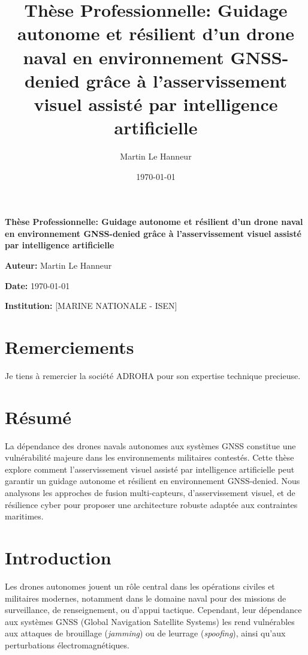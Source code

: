 \documentclass[12pt, a4paper, twoside, openright]{report}
\title{Thèse Professionnelle: Guidage autonome et résilient d’un drone naval en environnement GNSS-denied grâce à l’asservissement visuel assisté par intelligence artificielle}
\author{Martin Le Hanneur}
\date{\today}
\begin{document}
\begin{titlepage}
    \begin{center}
        {\Huge \textbf{Thèse Professionnelle: Guidage autonome et résilient d’un drone naval en environnement GNSS-denied grâce à l’asservissement visuel assisté par intelligence artificielle} \par}
        {\Large \textbf{Auteur:} Martin Le Hanneur \par}
        {\large \textbf{Date:} \today \par}    
        {\large \textbf{Institution:} [MARINE NATIONALE - ISEN] \par}
        \vfill
    \end{center}
\end{titlepage}

\cleardoublepage
\chapter*{Remerciements}
Je tiens à remercier la société ADROHA pour son expertise technique precieuse.

\cleardoublepage
\chapter*{Résumé}
La dépendance des drones navals autonomes aux systèmes GNSS constitue une vulnérabilité majeure dans les environnements militaires contestés. Cette thèse explore comment l’asservissement visuel assisté par intelligence artificielle peut garantir un guidage autonome et résilient en environnement GNSS-denied. Nous analysons les approches de fusion multi-capteurs, d’asservissement visuel, et de résilience cyber pour proposer une architecture robuste adaptée aux contraintes maritimes.

\cleardoublepage%
\tableofcontents
\cleardoublepage%
\listoffigures
\cleardoublepage%
\listoftables
\cleardoublepage%

\chapter{Introduction}
Les drones autonomes jouent un rôle central dans les opérations civiles et militaires modernes, notamment dans le domaine naval pour des missions de surveillance, de renseignement, ou d’appui tactique. Cependant, leur dépendance aux systèmes GNSS (Global Navigation Satellite Systems) les rend vulnérables aux attaques de brouillage (\textit{jamming}) ou de leurrage (\textit{spoofing}), ainsi qu’aux perturbations électromagnétiques.
\end{document}
